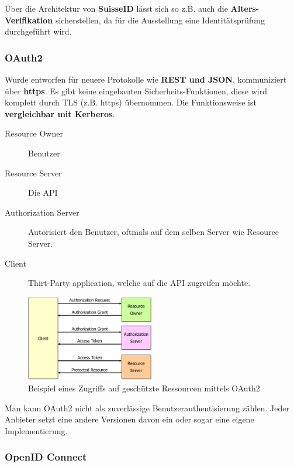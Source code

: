 Über die Architektur von \textbf{SuisseID} lässt sich so z.B. auch die \textbf{Alters-Verifikation} sicherstellen, da für die Ausstellung eine Identitätsprüfung durchgeführt wird.

\subsubsection{OAuth2}
Wurde entworfen für neuere Protokolle wie \textbf{REST und JSON}, kommuniziert über \textbf{https}. Es gibt keine eingebauten Sicherheits-Funktionen, diese wird komplett durch TLS (z.B. https) übernommen. Die Funktionsweise ist \textbf{vergleichbar mit Kerberos}.\\

\begin{description}
	\item[Resource Owner] Benutzer
	\item[Resource Server] Die API
	\item[Authorization Server] Autorisiert den Benutzer, oftmals auf dem selben Server wie Resource Server.
	\item[Client] Thirt-Party application, welche auf die API zugreifen möchte.
\end{description}


\begin{figure}[H]
	\centering
	\includegraphics[width=0.5\textwidth]{./img/oauth2-example}
	\caption{Beispiel eines Zugriffs auf geschützte Ressourcen mittels OAuth2}
\end{figure}

Man kann OAuth2 nicht als zuverlässige Benutzerauthentisierung zählen. Jeder Anbieter setzt eine andere Versionen davon ein oder sogar eine eigene Implementierung.

\subsubsection{OpenID Connect}
